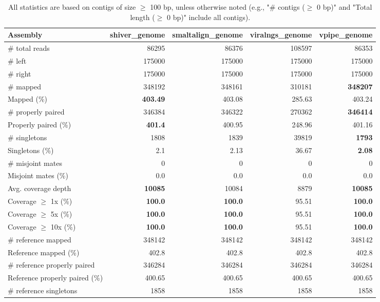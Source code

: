 \documentclass[12pt,a4paper]{article}
\begin{document}
\begin{table}[ht]
\begin{center}
\caption{All statistics are based on contigs of size $\geq$ 100 bp, unless otherwise noted (e.g., "\# contigs ($\geq$ 0 bp)" and "Total length ($\geq$ 0 bp)" include all contigs).}
\begin{tabular}{|l*{4}{|r}|}
\hline
Assembly & shiver\_genome & smaltalign\_genome & viralngs\_genome & vpipe\_genome \\ \hline
\# total reads & 86295 & 86376 & 108597 & 86353 \\ \hline
\# left & 175000 & 175000 & 175000 & 175000 \\ \hline
\# right & 175000 & 175000 & 175000 & 175000 \\ \hline
\# mapped & 348192 & 348161 & 310181 & {\bf 348207} \\ \hline
Mapped (\%) & {\bf 403.49} & 403.08 & 285.63 & 403.24 \\ \hline
\# properly paired & 346384 & 346322 & 270362 & {\bf 346414} \\ \hline
Properly paired (\%) & {\bf 401.4} & 400.95 & 248.96 & 401.16 \\ \hline
\# singletons & 1808 & 1839 & 39819 & {\bf 1793} \\ \hline
Singletons (\%) & 2.1 & 2.13 & 36.67 & {\bf 2.08} \\ \hline
\# misjoint mates & 0 & 0 & 0 & 0 \\ \hline
Misjoint mates (\%) & 0.0 & 0.0 & 0.0 & 0.0 \\ \hline
Avg. coverage depth & {\bf 10085} & 10084 & 8879 & {\bf 10085} \\ \hline
Coverage $\geq$ 1x (\%) & {\bf 100.0} & {\bf 100.0} & 95.51 & {\bf 100.0} \\ \hline
Coverage $\geq$ 5x (\%) & {\bf 100.0} & {\bf 100.0} & 95.51 & {\bf 100.0} \\ \hline
Coverage $\geq$ 10x (\%) & {\bf 100.0} & {\bf 100.0} & 95.51 & {\bf 100.0} \\ \hline
\# reference mapped & 348142 & 348142 & 348142 & 348142 \\ \hline
Reference mapped (\%) & 402.8 & 402.8 & 402.8 & 402.8 \\ \hline
\# reference properly paired & 346284 & 346284 & 346284 & 346284 \\ \hline
Reference properly paired (\%) & 400.65 & 400.65 & 400.65 & 400.65 \\ \hline
\# reference singletons & 1858 & 1858 & 1858 & 1858 \\ \hline

\end{tabular}
\end{center}
\end{table}
\end{document}

